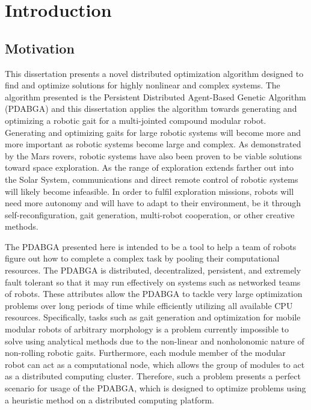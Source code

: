 

\chapter{Introduction} %
  \section{Motivation} %
    This dissertation presents a novel distributed optimization algorithm designed
      to find and optimize solutions for highly nonlinear and complex systems.
    The algorithm presented is the Persistent Distributed Agent-Based Genetic 
      Algorithm (PDABGA) and this dissertation applies the algorithm towards 
      generating and optimizing a robotic gait for a multi-jointed compound
      modular robot.        
    Generating and optimizing gaits for large robotic systems will become more
      and more important as robotic systems become large and complex. 
    As demonstrated by the Mars rovers, robotic systems have also been proven
      to be viable solutions toward space exploration.
    As the range of exploration extends farther out into the Solar System, 
      communications and direct remote control of robotic systems will likely
      become infeasible.
    In order to fulfil exploration missions, robots will need more autonomy and
      will have to adapt to their environment, be it through self-reconfiguration,
      gait generation, multi-robot cooperation, or other creative methods.

    The PDABGA presented here is intended to be a tool to help a team of robots
      figure out how to complete a complex task by pooling their computational
      resources. 
    The PDABGA is distributed, decentralized, persistent, and extremely fault
      tolerant so that it may run effectively on systems such as networked teams
      of robots. 
    These attributes allow the PDABGA to tackle very large optimization problems
      over long periods of time while efficiently utilizing all available CPU
      resources.
    Specifically, tasks such as gait generation and optimization for mobile
      modular robots of arbitrary morphology is a problem currently impossible
      to solve using analytical methods due to the non-linear and nonholonomic
      nature of non-rolling robotic gaits. 
    Furthermore, each module member of the modular robot can act as a 
      computational node, which allows the group of modules to act as a 
      distributed computing cluster. 
    Therefore, such a problem presents a perfect scenario for usage of the PDABGA,
      which is designed to optimize problems using a heuristic method on a
      distributed computing platform.

